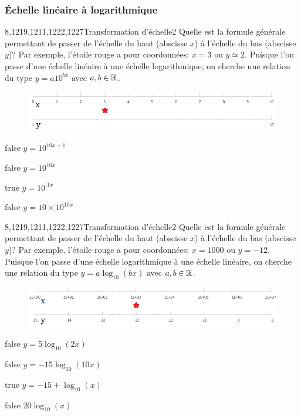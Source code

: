 \documentclass[11pt]{article}
\begin{document}
        \subsubsection{Échelle linéaire à logarithmique}
			\begin{question}{8,1219,1211,1222,1227}{Transformation d'échelle}{2}{}
				Quelle est la formule générale permettant de passer de l'échelle du haut (abscisse $x$) à l'échelle du bas (abscisse $y$)? Par exemple, l'étoile rouge a pour coordonnées: $x=\num{3}$ ou $y\simeq\num{2}$. Puisque l'on passe d'une échelle linéaire à une échelle logarithmique, on cherche une relation du type $y = a10^{bx}$ avec $a,b\in\mathbb {R} $.
				\begin{figure}
					\centering
					\includegraphics[scale=.75]{Antoine/Figures_Antoine/lin_1_10_to_log_1_10_star_3_2.png}
				\end{figure}
			\end{question}
			\begin{reponses}
				\item[false] $y = 10^{10x+1}$
				\item[false] $y = 10^{10x}$
				\item[true] $y = 10^{\num{.1}x}$
				\item[false] $y = 10\times 10^{10x}$
			\end{reponses}
		
			\begin{question}{8,1219,1211,1222,1227}{Transformation d'échelle}{2}{}
				Quelle est la formule générale permettant de passer de l'échelle du haut (abscisse $x$) à l'échelle du bas (abscisse $y$)? Par exemple, l'étoile rouge a pour coordonnées: $x=\num{1000}$ ou $y=\num{-12}$. Puisque l'on passe d'une échelle logarithmique à une échelle linéaire, on cherche une relation du type $y = a\log_{10}(bx)$ avec $a,b\in\mathbb {R} $.
				\begin{figure}
					\centering
					\includegraphics[scale=.75]{Antoine/Figures_Antoine/log_1_1e7_to_lin_-15_-8_star_1e3_-12.png}
				\end{figure}
			\end{question}
			\begin{reponses}
				\item[false] $y = 5\log_{10}(2x)$
				\item[false] $y = -15\log_{10}(10x)$
				\item[true] $y = -15+\log_{10}(x)$
				\item[false] $20\log_{10}(x)$
			\end{reponses}
		
\end{document}
